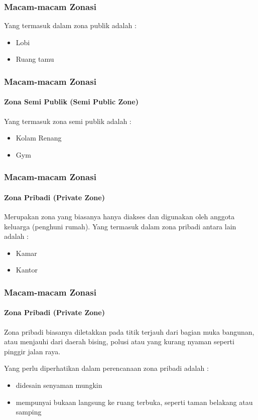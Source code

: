 \documentclass[../spa_2.tex]{subfiles}
\begin{document}
\begin{frame}[mytitle=standard,c,mycolor=digiPH_leaf,dark]

	\frametitle{Macam-macam Zonasi}
	Yang termasuk dalam zona publik adalah :
	\begin{itemize}
		\item Lobi
		\item Ruang tamu
	\end{itemize}

\end{frame}


\begin{frame}[mytitle=standard,c,mybg=bglight2,light]

	\frametitle{Macam-macam Zonasi}
	\framesubtitle{Zona Semi Publik (Semi Public Zone)}


	Yang termasuk zona semi publik adalah :
	\begin{itemize}
		\item Kolam Renang
		\item Gym
	\end{itemize}
\end{frame}

\begin{frame}[mytitle=standard,c,mycolor=digiPH_ubcblue,dark]

	\frametitle{Macam-macam Zonasi}
	\framesubtitle{Zona Pribadi (Private Zone)}

	Merupakan zona yang biasanya hanya diakses dan digunakan oleh anggota keluarga (penghuni rumah). Yang termasuk dalam zona pribadi antara lain adalah :

	\begin{itemize}
		\item Kamar
		\item Kantor
	\end{itemize}
\end{frame}


\begin{frame}[mytitle=standard,c,mycolor=digiPH_cream,light]

	\frametitle{Macam-macam Zonasi}
	\framesubtitle{Zona Pribadi (Private Zone)}
	Zona pribadi biasanya diletakkan pada titik terjauh dari bagian muka bangunan, atau menjauhi dari daerah bising, polusi atau yang kurang nyaman seperti pinggir jalan raya.

	Yang perlu diperhatikan dalam perencanaan zona pribadi adalah :

	\begin{itemize}
		\item didesain senyaman mungkin
		\item mempunyai bukaan langsung ke ruang terbuka, seperti taman belakang atau samping
	\end{itemize}
\end{frame}
\end{document}
